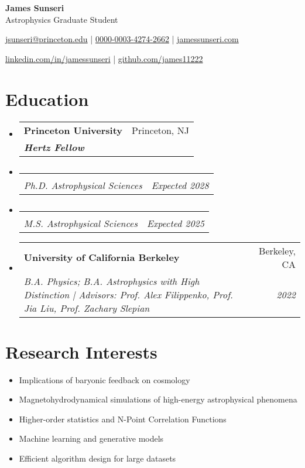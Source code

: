 \documentclass[letterpaper,10pt]{article}
\makeatletter
\newcommand{\resumeItemSimple}[2]{
  \item\small{
    \textbf{#1}{#2 \vspace{-3pt}}
  }
}
\newcommand{\resumeSubheading}[4]{
  \vspace{-1pt}\item[]
  \begin{tabular*}{0.98\textwidth}{l@{\extracolsep{\fill}}r}
      \hspace{-10pt}\textbf{#1} & #2 \\
      \hspace{-10pt}\textit{\small#3} & \textit{\small #4} \\
    \end{tabular*}\vspace{-3pt}
}
\newcommand{\resumeSubHeadingListStart}{\begin{itemize}[leftmargin=*]}
\newcommand{\resumeSubHeadingListEnd}{\end{itemize}}
\newcommand{\resumeItemListStart}{\begin{itemize}}
\newcommand{\shorterSection}[1]{\vspace{-10pt}\section{#1}}
\newcommand{\LinkedinLogo}{\textcolor{rgb:red,6;green,108;blue,170}{\faLinkedinSquare}}
\makeatother
\begin{document}
\begin{center}
  \textbf{\huge James Sunseri} \\ \vspace{0.07in} 
  {\Large Astrophysics Graduate Student} \\ \vspace{0.05in} 
  


  {\normalsize \faSendO \hspace{0pt} \href{href="mailto:jsunseri@princeton.edu"}{jsunseri@princeton.edu} | {\Large {}} \hspace{-2pt} \href{https://orcid.org/0000-0003-4274-2662/}{0000-0003-4274-2662} | \faUser \hspace{0 pt} \href{https://www.jamessunseri.com}{jamessunseri.com} \par \vspace{0.05in} \LinkedinLogo \hspace{0pt} \href{https://www.linkedin.com/in/jamessunseri}{linkedin.com/in/jamessunseri} | \faGithubSquare \hspace{0pt} \href{https://github.com/james11222}{github.com/james11222}}
\end{center}

\shorterSection{Education}
  \resumeSubHeadingListStart
    \resumeSubheading
      {Princeton University}{Princeton, NJ}
      {\textbf{Hertz Fellow}}{}{
    }
    \vspace{-20pt}
    \resumeSubheading
    {}{}{Ph.D. Astrophysical Sciences }{Expected 2028}{
    }
    \vspace{-20pt}
    \resumeSubheading
    {}{}{M.S. Astrophysical Sciences }{Expected 2025}{
    }
    \resumeSubheading
      {University of California Berkeley}{Berkeley, CA}
      {B.A. Physics; B.A. Astrophysics with High Distinction | Advisors: Prof. Alex Filippenko, Prof. Jia Liu, Prof. Zachary Slepian}{2022}{
    }

  \resumeSubHeadingListEnd
  
 
\shorterSection{Research Interests}

\resumeItemListStart
\resumeItemSimple{}{Implications of baryonic feedback on cosmology}
\resumeItemSimple{}{Magnetohydrodynamical simulations of high-energy astrophysical phenomena}
\resumeItemSimple{}{Higher-order statistics and N-Point Correlation Functions}
\resumeItemSimple{}{Machine learning and generative models}
\resumeItemSimple{}{Efficient algorithm design for large datasets}{}
\resumeSubHeadingListEnd
\end{document}
